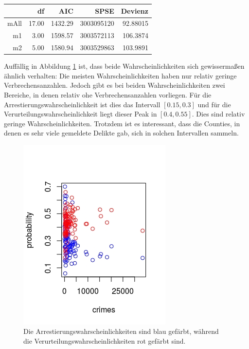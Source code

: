 \begin{table}[ht]
\centering
\begin{tabular}{rrrrr}
  \hline
 & df & AIC & SPSE & Devienz\\ 
  \hline
mAll & 17.00 & 1432.29 & 3003095120 & 92.88015 \\ 
  m1 & 3.00 & 1598.57 & 3003572113 & 106.3874\\ 
  m2 & 5.00 & 1580.94 & 3003529863 & 103.9891\\ 
   \hline
\end{tabular}
\label{tab:sfm}
\end{table}

Auff\"allig in Abbildung \ref{fig:nbd} ist, dass beide Wahrscheinlichkeiten sich gewisserma\ss{}en \"ahnlich verhalten:
Die meisten Wahrscheinlichkeiten haben nur relativ geringe Verbrechensanzahlen.
Jedoch gibt es bei beiden Wahrscheinlichkeiten zwei Bereiche, in denen relativ ohe Verbrechensanzahlen vorliegen.
F\"ur die Arrestierungswahrscheinlichkeit ist dies das Intervall $[0.15, 0.3]$ und f\"ur die Verurteilungswahrscheinlichkeit liegt dieser Peak in $[0.4, 0.55]$.
Dies sind relativ geringe Wahrscheinlichkeiten.
Trotzdem ist es interessant, dass die Counties, in denen es sehr viele gemeldete Delikte gab, sich in solchen Intervallen sammeln. 
 

\begin{figure}
\centering
\includegraphics[scale=0.7]{./jpgs/prvc.jpeg}
\caption{Die Arrestierungswahrscheinlichkeiten sind blau gef\"arbt, w\"ahrend die Verurteilungswahrscheinlichkeiten rot gef\"arbt sind.}
\label{fig:nbd}
\end{figure}


